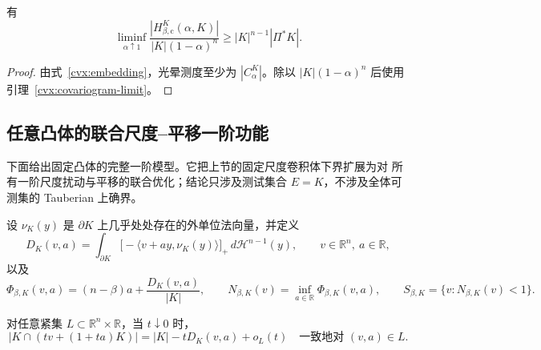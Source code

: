 \begin{corollary}[投影体给出的中心光晕下界]
\label{cvx:projection-liminf}
有
\begin{equation}
 \liminf_{\alpha\uparrow1}
 \frac{|H^K_{\beta,\mathrm c}(\alpha,K)|}{|K|(1-\alpha)^n}
 \ge |K|^{n-1}|\Pi^*K|.
 \label{cvx:projection-liminf-formula}
\end{equation}
\end{corollary}

\begin{proof}
由式~\eqref{cvx:embedding}，光晕测度至少为 $|C^K_\alpha|$。除以
$|K|(1-\alpha)^n$ 后使用引理~\ref{cvx:covariogram-limit}。
\end{proof}

\subsection{任意凸体的联合尺度--平移一阶功能}

下面给出固定凸体的完整一阶模型。它把上节的固定尺度卷积体下界扩展为对
所有一阶尺度扰动与平移的联合优化；结论只涉及测试集合 $E=K$，不涉及全体可测集的
Tauberian 上确界。

设 $\nu_K(y)$ 是 $\partial K$ 上几乎处处存在的外单位法向量，并定义
\begin{equation}
 D_K(v,a)=\int_{\partial K}
 \bigl[-\langle v+ay,\nu_K(y)\rangle\bigr]_+\,d\mathcal H^{n-1}(y),
 \qquad v\in\mathbb R^n,\ a\in\mathbb R,
 \label{cvx:boundary-defect}
\end{equation}
以及
\begin{equation}
 \Phi_{\beta,K}(v,a)=(n-\beta)a+\frac{D_K(v,a)}{|K|},
 \qquad
 N_{\beta,K}(v)=\inf_{a\in\mathbb R}\Phi_{\beta,K}(v,a),
 \qquad S_{\beta,K}=\{v:N_{\beta,K}(v)<1\}.
 \label{cvx:tangent-functional}
\end{equation}

\begin{lemma}[位似仿射流的一阶交叠公式]
\label{cvx:first-variation}
对任意紧集 $L\subset\mathbb R^n\times\mathbb R$，当 $t\downarrow0$ 时，
\begin{equation}
 |K\cap(tv+(1+ta)K)|=|K|-tD_K(v,a)+o_L(t)
 \quad\text{一致地对 }(v,a)\in L.
 \label{cvx:first-variation-formula}
\end{equation}
\end{lemma}

